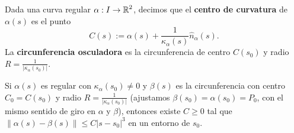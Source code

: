 \begin{definition}
Dada una curva regular $\displaystyle \alpha: I \to \mathbb{R}^{2} $, decimos que el \textbf{centro de curvatura} de $\displaystyle \alpha\left(s\right) $ es el punto
\[C\left(s\right):=\alpha\left(s\right)+\frac{1}{\kappa_{\alpha }\left(s\right)}\hat{n}_{\alpha }\left(s\right) .\]
La \textbf{circunferencia osculadora} es la circunferencia de centro $\displaystyle C\left(s_{0}\right) $ y radio $\displaystyle R = \frac{1}{ \left|\kappa_{\alpha }\left(s_{0}\right)\right|} $.
\end{definition}
\begin{prop}
Si $\displaystyle \alpha\left(s\right) $ es regular con $\displaystyle \kappa_{\alpha }\left(s_{0}\right)\neq 0 $ y $\displaystyle \beta\left(s\right) $ es la circunferencia con centro $\displaystyle C_{0}=C\left(s_{0}\right) $ y radio $\displaystyle R = \frac{1}{ \left|\kappa_{\alpha }\left(s_{0}\right)\right|} $ (ajustamos $\displaystyle \beta\left(s_{0}\right)=\alpha\left(s_{0}\right)=P_{0} $, con el mismo sentido de giro en $\displaystyle \alpha  $ y $\displaystyle \beta  $),
entonces existe $\displaystyle C \geq 0 $ tal que $\displaystyle \|\alpha\left(s\right)-\beta\left(s\right)\|\leq C \left|s-s_{0}\right|^{3} $ en un entorno de $\displaystyle s_{0} $. 
\end{prop}
